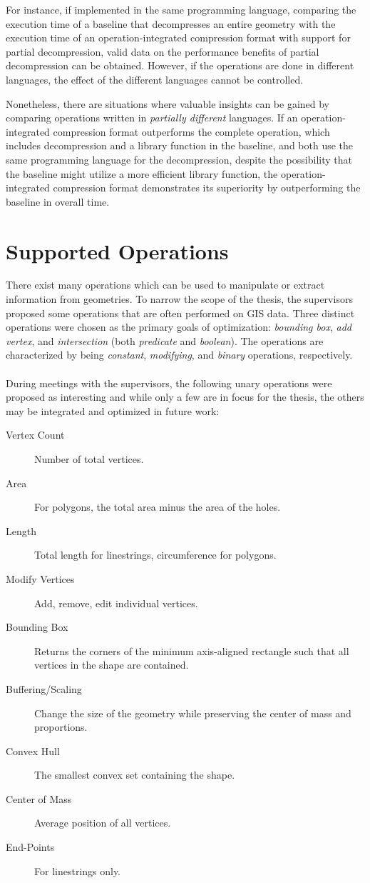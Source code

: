For instance, if implemented in the same programming language, comparing the execution time of a baseline that decompresses an entire geometry with the execution time of an operation-integrated compression format with support for partial decompression, valid data on the performance benefits of partial decompression can be obtained. However, if the operations are done in different languages, the effect of the different languages cannot be controlled.

Nonetheless, there are situations where valuable insights can be gained by comparing operations written in \textit{partially different} languages. If an operation-integrated compression format outperforms the complete operation, which includes decompression and a library function in the baseline, and both use the same programming language for the decompression, despite the possibility that the baseline might utilize a more efficient library function, the operation-integrated compression format demonstrates its superiority by outperforming the baseline in overall time.

\section{Supported Operations}
There exist many operations which can be used to manipulate or extract information from geometries. To narrow the scope of the thesis, the supervisors proposed some operations that are often performed on GIS data. Three distinct operations were chosen as the primary goals of optimization: \emph{bounding box}, \emph{add vertex}, and \emph{intersection} (both \emph{predicate} and \emph{boolean}). The operations are characterized by being \emph{constant}, \emph{modifying}, and \emph{binary} operations, respectively.
\\\\
During meetings with the supervisors, the following unary operations were proposed as interesting and while only a few are in focus for the thesis, the others may be integrated and optimized in future work:
\begin{description}
    \item[Vertex Count] Number of total vertices.
    \item[Area] For polygons, the total area minus the area of the holes.
    \item[Length] Total length for linestrings, circumference for polygons.
    \item[Modify Vertices] Add, remove, edit individual vertices.
    \item[Bounding Box] Returns the corners of the minimum axis-aligned rectangle such that all vertices in the shape are contained.
    \item[Buffering/Scaling] Change the size of the geometry while preserving the center of mass and proportions. 
    \item[Convex Hull] The smallest convex set containing the shape.
    \item[Center of Mass] Average position of all vertices.
    \item[End-Points] For linestrings only.
\end{description}

